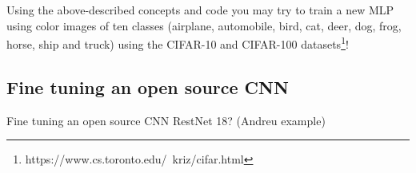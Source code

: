 




Using the above-described concepts and code you may try to train a new MLP using color images of ten classes (airplane, automobile, bird, cat, deer, dog, frog, horse, ship and truck) using the CIFAR-10 and CIFAR-100 datasets\footnote{https://www.cs.toronto.edu/~kriz/cifar.html}!


\subsection{Fine tuning an open source CNN}
\label{subsec:tuning}

Fine tuning an open source CNN   RestNet 18? (Andreu example)